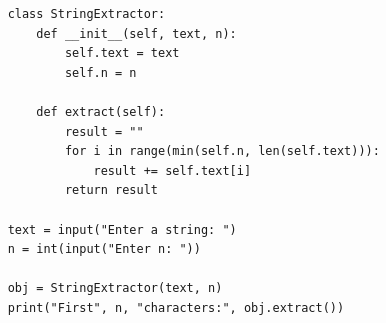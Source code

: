 \begin{verbatim}
    class StringExtractor:
        def __init__(self, text, n):
            self.text = text
            self.n = n
    
        def extract(self):
            result = ""
            for i in range(min(self.n, len(self.text))):
                result += self.text[i]
            return result
    
    text = input("Enter a string: ")
    n = int(input("Enter n: "))
    
    obj = StringExtractor(text, n)
    print("First", n, "characters:", obj.extract())
\end{verbatim}